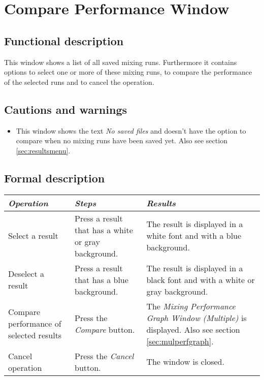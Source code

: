 \section{Compare Performance Window}
\label{sec:compareperf}
  \subsection*{Functional description}
  This window shows a list of all saved mixing runs. Furthermore it contains options to select one or more of these mixing runs, to compare the  performance of the selected runs and to cancel the operation.

  \subsection*{Cautions and warnings}
  \begin{itemize}
  \item This window shows the text \emph{No saved files} and doesn't have the option to compare when no mixing runs have been saved yet. Also see section \ref{sec:resultsmenu}.
  \end{itemize}

  \subsection*{Formal description}
    \begin{tabularx}{\textwidth}{XXX}
    \toprule
    \emph{Operation} & \emph{Steps} & \emph{Results} \\
    \midrule
    Select a result & Press a result that has a white or gray background. & The result is displayed in a white font and with a blue background. \\
    \midrule
    Deselect a result & Press a result that has a blue background. & The result is displayed in a black font and with a white or gray background. \\
    \midrule
    Compare performance of selected results & Press the \emph{Compare} button. & The \emph{Mixing Performance Graph Window (Multiple)} is displayed. Also see section \ref{sec:mulperfgraph}. \\
    \midrule
    Cancel operation & Press the \emph{Cancel} button. & The window is closed. \\
    \bottomrule
\end{tabularx}

